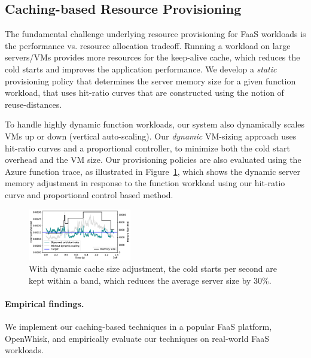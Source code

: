 \documentclass[pageno]{jpaper}
\begin{document}
\subsection{Caching-based Resource Provisioning}
\vspace*{\subsecspace}

The fundamental challenge underlying resource provisioning for FaaS workloads is the performance vs. resource allocation tradeoff. 
Running a workload on large servers/VMs provides more resources for the keep-alive cache, which reduces the cold starts and improves the application performance.
We develop a \emph{static} provisioning policy that determines the server memory size for a given function workload, that uses hit-ratio curves that are constructed using the notion of reuse-distances. 

To handle highly dynamic function workloads, our system also dynamically scales VMs up or down (vertical auto-scaling). 
Our \emph{dynamic} VM-sizing approach uses hit-ratio curves and a proportional controller, to minimize both the cold start overhead and the VM size.
Our provisioning policies are also evaluated using the Azure function trace, as illustrated in Figure~\ref{fig:dynamic}, which shows the dynamic server memory adjustment in response to the function workload using our hit-ratio curve and proportional control based method. 

\begin{figure}[t]
    \vspace*{\myfigspace}
  \centering 
  \includegraphics[width=0.4\textwidth]{../graphs/dyn-scale-392-b.pdf}
    \vspace*{\myfigspace}
  \caption{With dynamic cache size adjustment, the cold starts per second are kept within a band, which reduces the average server size by 30\%.}
  \label{fig:dynamic}
  \vspace*{\myfigspace}
\end{figure}



\paragraph{Empirical findings.}
 We implement our caching-based techniques in a popular FaaS platform, OpenWhisk, and empirically evaluate our techniques on real-world FaaS workloads.
\end{document}

